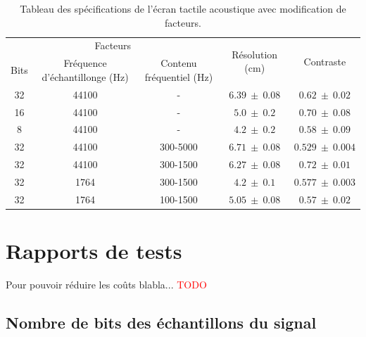 \documentclass[11pt,letterpaper]{article}
\begin{document}
\begin{table}[H]
    \centering
    \begin{tabular}{c c c | c c}
    \hline
    \multicolumn{3}{c|}{Facteurs} & \multirow{2}{*}{Résolution (cm)} & \multirow{2}{*}{Contraste} \\ 
    Bits & Fréquence d'échantillonge (Hz) & Contenu fréquentiel (Hz) & & \\
    \hline
    32 & 44100 & - & $6.39\ \pm \ 0.08$ & $0.62 \ \pm\ 0.02$ \\
    16 & 44100 & - & $5.0\ \pm \ 0.2$ & $0.70 \ \pm\ 0.08$ \\
    8 & 44100 & - & $4.2 \ \pm\ 0.2$ & $0.58  \ \pm\ 0.09$ \\
    32 & 44100 & 300-5000 & $6.71\ \pm\ 0.08$ & $0.529\ \pm\ 0.004$ \\
    32 & 44100 & 300-1500 &	$6.27\ \pm\ 0.08$ &	$0.72\ \pm\ 0.01$ \\
    32 & 1764 & 300-1500 &	$4.2\ \pm\ 0.1$ & $0.577\ \pm\ 0.003$\\
    32 & 1764 & 100-1500 & $5.05\ \pm\ 0.08$ & $0.57\ \pm\ 0.02$ \\
    \hline
    \end{tabular}
    \caption{Tableau des spécifications de l'écran tactile acoustique avec modification de facteurs.\label{specs}}
  \end{table}


\section{Rapports de tests}






Pour pouvoir réduire les coûts blabla... \textcolor{red}{TODO}

\subsection{Nombre de bits des échantillons du signal}
\end{document}
